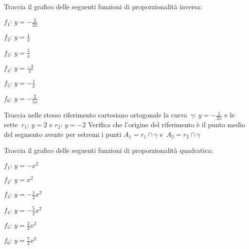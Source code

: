 \begin{esercizio}
\label{ese:D.51}
Traccia il grafico delle seguenti funzioni di proporzionalità inversa:
\begin{multicols}{3}
 \begin{enumeratea}
\item \(f_{1}:\, y=-{\frac{3}{2x}}\)
\item \(f_{2}:\, y=\frac{1}{x}\)
\item \(f_{3}:\, y=\frac{5}{x}\)
\item \(f_{4}:\, y=\frac{-3}{x}\)
\item \(f_{5}:\, y=-{\frac{1}{x}}\)
\item \(f_{6}:\, y=-\frac{2}{5x}\)
\end{enumeratea}
\end{multicols}
\end{esercizio}

\begin{esercizio}
\label{ese:D.52}
Traccia nelle stesso riferimento cartesiano ortogonale la curva~\(\gamma:\, 
y=-{\frac{1}{2x}}\) e le rette~\(r_{1}:\, y=2\) e
\(r_{2}:\, y=-2\) Verifica che l'origine del riferimento è il punto medio del 
segmento avente per estremi i punti
\(A_{1}=r_{1}\cap \gamma\) e~\(A_{2}=r_{2}\cap \gamma\)
\end{esercizio}

\begin{esercizio}
\label{ese:D.53}
Traccia il grafico delle seguenti funzioni di proporzionalità quadratica:
\begin{multicols}{3}
 \begin{enumeratea}
\item \(f_{1}:\, y=-x^{2}\)
\item \(f_{2}:\, y=x^{2}\)
\item \(f_{3}:\, y=-{\frac{1}{2}}x^{2}\)
\item \(f_{4}:\, y=-{\frac{5}{2}}x^{2}\)
\item \(f_{5}:\, y=\frac{3}{4}x^{2}\)
\item \(f_{6}:\, y=\frac{7}{3}x^{2}\)
\end{enumeratea}
\end{multicols}
\end{esercizio}


